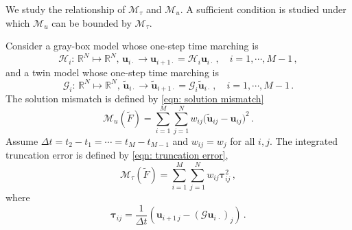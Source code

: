 We study the relationship of $\mathcal{M}_{\tau}$ and $\mathcal{M}_{u}$.
A sufficient condition is studied under which $\mathcal{M}_u$ can be bounded by 
$\mathcal{M}_{\tau}$.\\

\begin{theorem}
    Consider a gray-box model whose one-step time marching is
    \begin{equation}
        \mathcal{H}_i:\, \mathbb{R}^N\mapsto\mathbb{R}^N,\, {\boldsymbol{u}}_{i\cdot}\rightarrow 
        {\boldsymbol{u}}_{i+1\cdot}=\mathcal{H}_i
        {\boldsymbol{u}}_{i\cdot} \,,\quad i=1,\cdots, M-1\,,
    \end{equation}
    and a twin model whose one-step time marching is
    \begin{equation}
        \mathcal{G}_i:\, \mathbb{R}^N\mapsto\mathbb{R}^N,\, \tilde{\boldsymbol{u}}_{i\cdot}\rightarrow 
        \tilde{\boldsymbol{u}}_{i+1\cdot}=\mathcal{G}_i
        \tilde{\boldsymbol{u}}_{i\cdot} \,,\quad i=1,\cdots, M-1\,.
    \end{equation}
    The solution mismatch is defined by \eqref{eqn: solution mismatch}
    \begin{equation*}
        \mathcal{M}_u(\tilde{F}) = \sum_{i=1}^M \sum_{j=1}^N w_{ij} \big( \tilde{\boldsymbol{u}}_{ij}
         -\boldsymbol{u}_{ij}\big)^2 \,.
    \end{equation*}
    Assume $\Delta t= t_2-t_1=\cdots =t_{M}-t_{M-1}$ and $w_{ij} = w_{j}$ for all $i,j$.
    The integrated truncation error is defined by
    \eqref{eqn: truncation error},
    \begin{equation*}
        \mathcal{M}_{\tau}(\tilde{F}) = \sum_{i=1}^M \sum_{j=1}^N w_{ij} \boldsymbol{\tau}_{ij}^2 \,,
    \end{equation*}
    where 
    \begin{equation}
        \boldsymbol{\tau}_{ij} = \frac{1}{\Delta t}
        \left(\boldsymbol{u}_{i+1\, j} - (\mathcal{G}\boldsymbol{u}_{i\, \cdot})_j\right)\,.
        \label{eqn: truncation discretized error}
    \end{equation}

\end{theorem}
